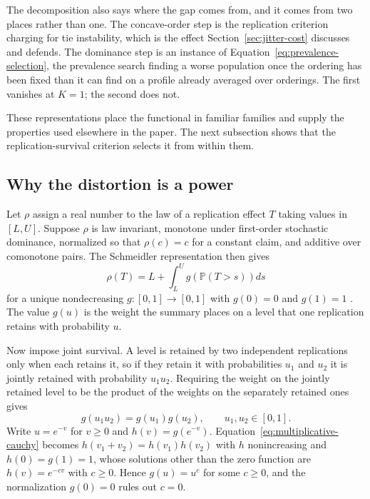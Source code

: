 \documentclass[11pt]{article}
\newcommand{\Prb}{\mathbb{P}}
\theoremstyle{remark}
\begin{document}
The decomposition also says where the gap comes from, and it comes from two places rather than one. The concave-order step is the replication criterion charging for tie instability, which is the effect Section~\ref{sec:jitter-cost} discusses and defends. The dominance step is an instance of Equation~\eqref{eq:prevalence-selection}, the prevalence search finding a worse population once the ordering has been fixed than it can find on a profile already averaged over orderings. The first vanishes at $K=1$; the second does not.

These representations place the functional in familiar families and supply the properties used elsewhere in the paper. The next subsection shows that the replication-survival criterion selects it from within them.

\subsection{Why the distortion is a power}
\label{app:characterization}

Let $\rho$ assign a real number to the law of a replication effect $T$ taking values in $[L,U]$. Suppose $\rho$ is law invariant, monotone under first-order stochastic dominance, normalized so that $\rho(c)=c$ for a constant claim, and additive over comonotone pairs. The Schmeidler representation then gives
\begin{equation}
\rho(T)
=
L
+
\int_L^U
g\left(\Prb(T>s)\right)
ds
\label{eq:distortion-representation}
\end{equation}
for a unique nondecreasing $g:[0,1]\to[0,1]$ with $g(0)=0$ and $g(1)=1$ \cite{schmeidler1986integral,yaari1987dual}. The value $g(u)$ is the weight the summary places on a level that one replication retains with probability $u$.

Now impose joint survival. A level is retained by two independent replications only when each retains it, so if they retain it with probabilities $u_1$ and $u_2$ it is jointly retained with probability $u_1u_2$. Requiring the weight on the jointly retained level to be the product of the weights on the separately retained ones gives
\begin{equation}
g(u_1u_2)=g(u_1)g(u_2),
\qquad
u_1,u_2\in[0,1].
\label{eq:multiplicative-cauchy}
\end{equation}
Write $u=e^{-v}$ for $v\geq0$ and $h(v)=g(e^{-v})$. Equation~\eqref{eq:multiplicative-cauchy} becomes $h(v_1+v_2)=h(v_1)h(v_2)$ with $h$ nonincreasing and $h(0)=g(1)=1$, whose solutions other than the zero function are $h(v)=e^{-cv}$ with $c\geq0$. Hence $g(u)=u^{c}$ for some $c\geq0$, and the normalization $g(0)=0$ rules out $c=0$.
\end{document}
